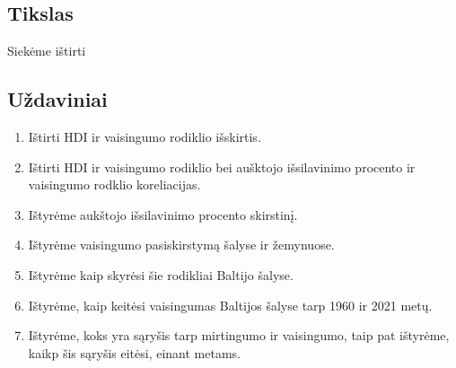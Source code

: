 \subsection{Tikslas} 
Siekėme ištirti 

\subsection{Uždaviniai}
\begin{enumerate}
    \item Ištirti HDI ir vaisingumo rodiklio išskirtis.
    \item Ištirti HDI ir vaisingumo rodiklio bei aušktojo išsilavinimo procento ir vaisingumo rodklio koreliacijas.
    \item Ištyrėme aukštojo išsilavinimo procento skirstinį.
    \item Ištyrėme vaisingumo pasiskirstymą šalyse ir žemynuose.
    \item Ištyrėme kaip skyrėsi šie rodikliai Baltijo šalyse.
    \item Ištyrėme, kaip keitėsi vaisingumas Baltijos šalyse tarp 1960 ir 2021 metų.
    \item Ištyrėme, koks yra sąryšis tarp mirtingumo ir vaisingumo, taip pat ištyrėme, kaikp šis sąryšis eitėsi, einant metams.
\end{enumerate}